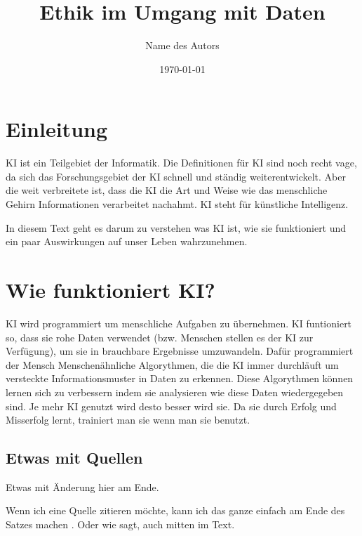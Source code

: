 \documentclass{report}
\title{Ethik im Umgang mit Daten}
\author{Name des Autors}
\date{\today}
\begin{document}
\maketitle


\tableofcontents

\chapter{Einleitung}

KI ist ein Teilgebiet der Informatik. Die Definitionen für KI sind noch recht vage, da sich das Forschungsgebiet der KI schnell und ständig weiterentwickelt. Aber die weit verbreitete ist,
dass die KI die Art und Weise wie das menschliche Gehirn Informationen verarbeitet nachahmt. KI steht für künstliche Intelligenz. 

In diesem Text geht es darum zu verstehen was KI ist, wie sie funktioniert und ein paar Auswirkungen auf unser Leben wahrzunehmen.

\chapter{Wie funktioniert KI?}

KI wird programmiert um menschliche Aufgaben zu übernehmen.
KI funtioniert so, dass sie rohe Daten verwendet (bzw. Menschen stellen es der KI zur Verfügung), um sie in brauchbare Ergebnisse umzuwandeln.
Dafür programmiert der Mensch Menschenähnliche Algorythmen, die die KI immer durchläuft um versteckte Informationsmuster in Daten zu erkennen.
Diese Algorythmen können lernen sich zu verbessern indem sie analysieren wie diese Daten wiedergegeben sind.
Je mehr KI genutzt wird desto besser wird sie. Da sie durch Erfolg und Misserfolg lernt, trainiert man sie wenn man sie benutzt.
\section{Etwas mit Quellen}

Etwas mit Änderung hier am Ende.

Wenn ich eine Quelle zitieren möchte, kann ich das ganze einfach am Ende des Satzes machen \citep{example}. Oder wie \citet{example} sagt, auch mitten im Text.

\printbibliography
\end{document}
